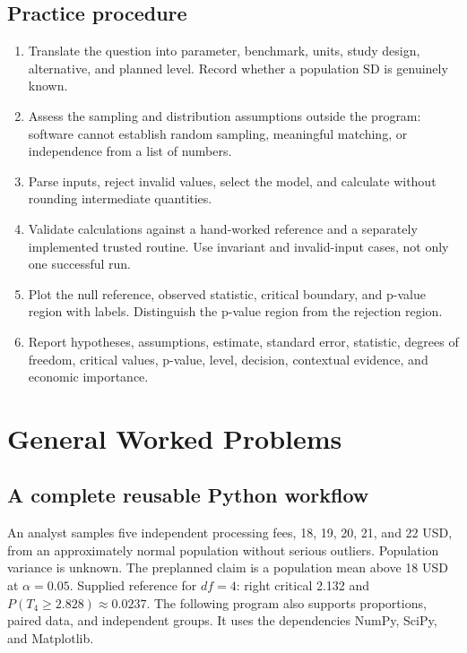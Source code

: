 \subsection{Practice procedure}
\begin{enumerate}
\item Translate the question into parameter, benchmark, units, study design, alternative, and planned level. Record whether a population SD is genuinely known.
\item Assess the sampling and distribution assumptions outside the program: software cannot establish random sampling, meaningful matching, or independence from a list of numbers.
\item Parse inputs, reject invalid values, select the model, and calculate without rounding intermediate quantities.
\item Validate calculations against a hand-worked reference and a separately implemented trusted routine. Use invariant and invalid-input cases, not only one successful run.
\item Plot the null reference, observed statistic, critical boundary, and p-value region with labels. Distinguish the p-value region from the rejection region.
\item Report hypotheses, assumptions, estimate, standard error, statistic, degrees of freedom, critical values, p-value, level, decision, contextual evidence, and economic importance.
\end{enumerate}
\section{General Worked Problems}\label{sec:general-worked}
\subsection{A complete reusable Python workflow}\label{prob:automation}
An analyst samples five independent processing fees, 18, 19, 20, 21, and 22 USD, from an approximately normal population without serious outliers. Population variance is unknown. The preplanned claim is a population mean above 18 USD at $\alpha=0.05$. Supplied reference for $df=4$: right critical 2.132 and $P(T_4\ge2.828)\approx0.0237$. The following program also supports proportions, paired data, and independent groups. It uses the dependencies NumPy, SciPy, and Matplotlib.
